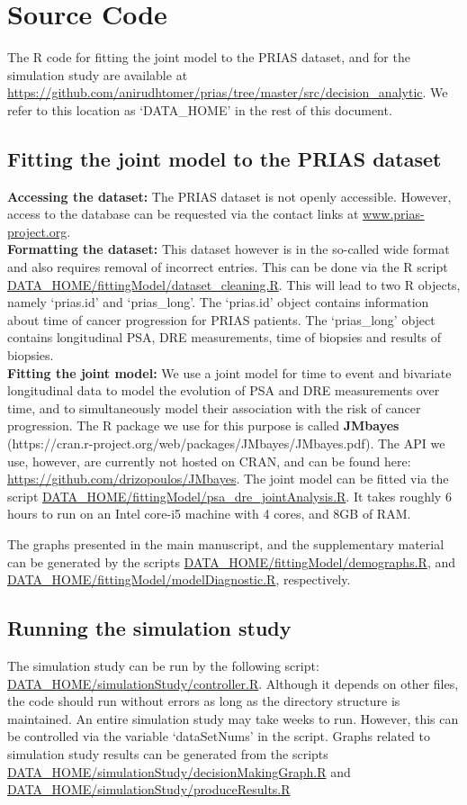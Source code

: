\section{Source Code}
\label{sec:src}
The R code for fitting the joint model to the PRIAS dataset, and for the simulation study are available at \url{https://github.com/anirudhtomer/prias/tree/master/src/decision_analytic}. We refer to this location as `DATA\_HOME' in the rest of this document.

\subsection{Fitting the joint model to the PRIAS dataset}
\textbf{Accessing the dataset:}
The PRIAS dataset is not openly accessible. However, access to the database can be requested via the contact links at \url{www.prias-project.org}.\\

\textbf{Formatting the dataset:}
This dataset however is in the so-called wide format and also requires removal of incorrect entries. This can be done via the R script \url{DATA_HOME/fittingModel/dataset_cleaning.R}. This will lead to two R objects, namely `prias.id' and `prias\_long'. The `prias.id' object contains information about time of cancer progression for PRIAS patients. The `prias\_long' object contains longitudinal PSA, DRE measurements, time of biopsies and results of biopsies.\\

\textbf{Fitting the joint model:}
We use a joint model for time to event and bivariate longitudinal data to model the evolution of PSA and DRE measurements over time, and to simultaneously model their association with the risk of cancer progression. The R package we use for this purpose is called \textbf{JMbayes} (https://cran.r-project.org/web/packages/JMbayes/JMbayes.pdf). The API we use, however, are currently not hosted on CRAN, and can be found here:
\url{https://github.com/drizopoulos/JMbayes}. The joint model can be fitted via the script \url{DATA_HOME/fittingModel/psa_dre_jointAnalysis.R}. It takes roughly 6 hours to run on an Intel core-i5 machine with 4 cores, and 8GB of RAM. 

The graphs presented in the main manuscript, and the supplementary material can be generated by the scripts \url{DATA_HOME/fittingModel/demographs.R}, and \url{DATA_HOME/fittingModel/modelDiagnostic.R}, respectively.

\subsection{Running the simulation study}
The simulation study can be run by the following script: \url{DATA_HOME/simulationStudy/controller.R}. Although it depends on other files, the code should run without errors as long as the directory structure is maintained. An entire simulation study may take weeks to run. However, this can be controlled via the variable `dataSetNums' in the script. Graphs related to simulation study results can be generated from the scripts \url{DATA_HOME/simulationStudy/decisionMakingGraph.R} and \url{DATA_HOME/simulationStudy/produceResults.R} 